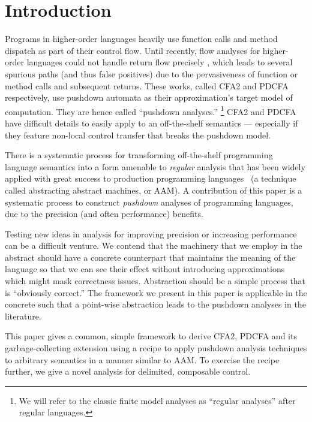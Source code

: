 
\section{Introduction}

Programs in higher-order languages heavily use function calls and method dispatch as part of their control flow.
%
Until recently, flow analyses for higher-order languages could not handle return flow precisely \citep{ianjohnson:vardoulakis-lmcs11, dvanhorn:Earl2010Pushdown}, which leads to several spurious paths (and thus false positives) due to the pervasiveness of function or method calls and subsequent returns.
%
These works, called CFA2 and PDCFA respectively, use pushdown automata as their approximation's target model of computation.
%
They are hence called ``pushdown analyses.''
%
\footnote{We will refer to the classic finite model analyses as ``regular analyses'' after regular languages.}
%
CFA2 and PDCFA have difficult details to easily apply to an off-the-shelf semantics --- especially if they feature non-local control transfer that breaks the pushdown model.

There is a systematic process for transforming off-the-shelf programming language semantics into a form amenable to \emph{regular} analysis that has been widely applied with great success to production programming languages~\citet{dvanhorn:VanHorn2010Abstracting} (a technique called abstracting abstract machines, or AAM).
%
A contribution of this paper is a systematic process to construct \emph{pushdown} analyses of programming languages, due to the precision (and often performance) benefits.
%


Testing new ideas in analysis for improving precision or increasing performance can be a difficult venture.
%
We contend that the machinery that we employ in the abstract should have a concrete counterpart that maintains the meaning of the language so that we can see their effect without introducing approximations which might mask correctness issues.
%
Abstraction should be a simple process that is ``obviously correct.''
%
The framework we present in this paper is applicable in the concrete such that a point-wise abstraction leads to the pushdown analyses in the literature.

This paper gives a common, simple framework to derive CFA2, PDCFA and its garbage-collecting extension using a recipe to apply pushdown analysis techniques to arbitrary semantics in a manner similar to AAM.
%
To exercise the recipe further, we give a novel analysis for delimited, composable control. \\

